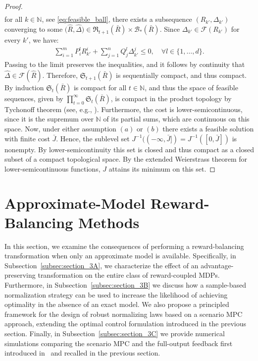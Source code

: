 \documentclass[10pt,leqno]{amsart}
\newcommand{\N}{\mathbb{N}}
\newcommand{\Cost}{R}
\begin{document}
\begin{proof}
\begin{align*}
    \end{align*}
    for all $k \in \N$, see \eqref{eq:feasible_ball}, there exists a subsequence $(\Cost_{k'}, \Delta_{k'})$ converging to some $\bigl(\hat{\Cost}, \hat{\Delta}\bigr) \in \mathfrak{R}_{t+1}(\bar{\Cost}) \times \mathcal{B}_*(\bar{\Cost})$. Since $\Delta_{k'} \in \mathcal{F}(\Cost_{k'})$ for every $k'$, we have:
    \begin{align*}
        \sum_{i = 1}^m P_i^l \Cost_{k'}^i + \sum_{j = 1}^n Q_j^l \Delta_{k'}^j \leq 0, \quad \forall l \in \{1, \hdots, d\}.
    \end{align*}
    Passing to the limit preserves the inequalities, and it follows by continuity that $\hat{\Delta} \in \mathcal{F}(\hat{\Cost})$. Therefore, $\mathfrak{S}_{t+1}(\bar{\Cost})$ is sequentially compact, and thus compact. By induction $\mathfrak{S}_t(\bar{\Cost})$ is compact for all $t \in \N$, and thus the space of feasible sequences, given by $\prod_{t = 0}^{\infty} \mathfrak{S}_t(\bar{\Cost})$, is compact in the product topology by Tychonoff theorem (see, e.g., \cite[Theorem 13]{kelley2017general}). Furthermore, the cost is lower-semicontinuous, since it is the supremum over $\N$ of its partial sums, which are continuous on this space. Now, under either assumption $(a)$ or $(b)$ there exists a feasible solution with finite cost $\bar{J}$. Hence, the sublevel set $J^{-1}((-\infty, \bar{J}]) = J^{-1}([0, \bar{J}])$ is nonempty. By lower-semicontinuity this set is closed and thus compact as a closed subset of a compact topological space. By the extended Weierstrass theorem for lower-semicontinuous functions, $J$ attains its minimum on this set.
\end{proof} \section{Approximate-Model Reward-Balancing Methods}
\label{sec:section_3}
In this section, we examine the consequences of performing a reward-balancing transformation when only an approximate model is available. Specifically, in Subsection~\ref{subsec:section_3A}, we characterize the effect of an advantage-preserving transformation on the entire class of reward-coupled MDPs. Furthermore, in Subsection~\ref{subsec:section_3B} we discuss how a sample-based normalization strategy can be used to increase the likelihood of achieving optimality in the absence of an exact model. We also propose a principled framework for the design of robust normalizing laws based on a scenario MPC approach, extending the optimal control formulation introduced in the previous section. Finally, in Subsection~\ref{subsec:section_3C} we provide numerical simulations comparing the scenario MPC and the full-output feedback first introduced in~\cite{mustafin2025mdpgeometrynormalizationreward} and recalled in the previous section.
%
\end{document}
